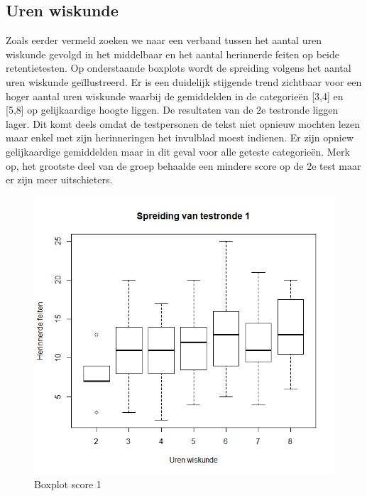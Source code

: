 \documentclass{hogent-article}
\begin{document}
	\subsection{Uren wiskunde}
	Zoals eerder vermeld zoeken we naar een verband tussen het aantal uren wiskunde gevolgd in het middelbaar en het aantal herinnerde feiten op beide retentietesten. Op onderstaande boxplots wordt de spreiding volgens het aantal uren wiskunde geïllustreerd. Er is een duidelijk stijgende trend zichtbaar voor een hoger aantal uren wiskunde waarbij de gemiddelden in de categorieën [3,4] en [5,8] op gelijkaardige hoogte liggen. De resultaten van de 2e testronde liggen lager. Dit komt deels omdat de testpersonen de tekst niet opnieuw mochten lezen maar enkel met zijn herinneringen het invulblad moest indienen. Er zijn opniew gelijkaardige gemiddelden maar in dit geval voor alle geteste categorieën. Merk op, het grootste deel van de groep behaalde een mindere score op de 2e test maar er zijn meer uitschieters.
	
	\begin{figure}[H]
		\includegraphics[width=\linewidth]{img/boxplot1.png}
		\caption{Boxplot score 1}
	\end{figure}
\end{document}

